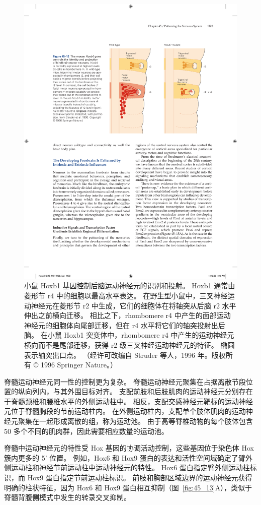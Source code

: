 \begin{figure}[htbp]
	\centering
	\includegraphics[width=0.75\linewidth]{chap45/fig_45_12}
	\caption{小鼠 Hoxb1 基因控制后脑运动神经元的识别和投射。 Hoxb1 通常由菱形节 r4 中的细胞以最高水平表达。 在野生型小鼠中，三叉神经运动神经元在菱形节 r2 中生成，它们的细胞体在将轴突从后脑 r2 水平伸出之前横向迁移。 相比之下，rhombomere r4 中产生的面部运动神经元的细胞体向尾部迁移，但在 r4 水平将它们的轴突投射出后脑。 在小鼠 Hoxb1 突变体中，rhombomere r4 中产生的运动神经元横向而不是尾部迁移，获得 r2 级三叉神经运动神经元的特征。 椭圆表示轴突出口点。 （经许可改编自 Struder 等人，1996 年。版权所有 © 1996 Springer Nature。）}
	\label{fig:45_12}
\end{figure}


脊髓运动神经元同一性的控制更为复杂。
脊髓运动神经元聚集在占据离散节段位置的纵向列内，与其外围目标对齐。
支配前肢和后肢肌肉的运动神经元分别存在于脊髓颈椎和腰椎水平的外侧运动柱中。
相反，支配交感神经元靶标的运动神经元位于脊髓胸段的节前运动柱内。
在外侧运动柱内，支配单个肢体肌肉的运动神经元聚集在一起形成离散的组，称为运动池。
由于高等脊椎动物的每个肢体包含 50 多个不同的肌肉群，因此需要相应数量的运动池。


脊髓中运动神经元的特性受 Hox 基因的协调活动控制，这些基因位于染色体 Hox 簇内更多的 5' 位置。
例如，Hox6 和 Hox9 蛋白的表达和活性空间域确定了臂外侧运动柱和神经节前运动柱中运动神经元的特性。
Hox6 蛋白指定臂外侧运动柱标识，而 Hox9 蛋白指定节前运动柱标识。
前肢和胸部区域边界的运动神经元获得明确的柱状特征，因为 Hox6 和 Hox9 蛋白相互抑制（图~\ref{fig:45_13}A），类似于脊髓背腹侧模式中发生的转录交叉抑制。


